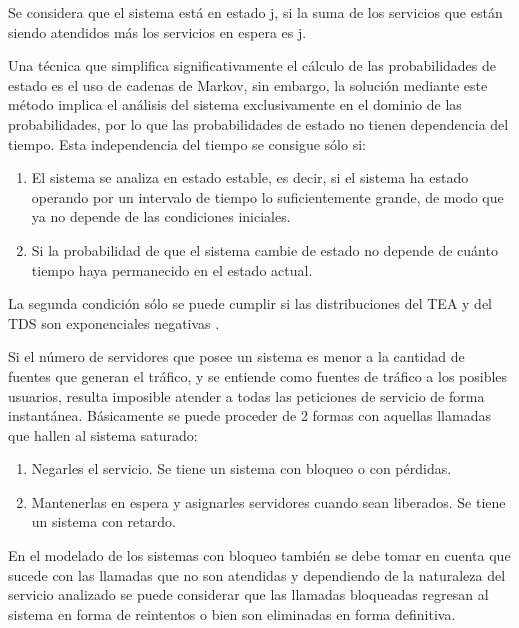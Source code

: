 Se considera que el sistema está en estado j, si la suma de los servicios que están siendo atendidos más los servicios en espera es j.\newline

Una técnica que simplifica significativamente el cálculo de las probabilidades de estado es el uso de cadenas de Markov, sin embargo, la solución mediante este método implica el análisis del sistema exclusivamente en el dominio de las probabilidades, por lo que las probabilidades de estado no tienen dependencia del tiempo. Esta independencia del tiempo se consigue sólo si:

\begin{enumerate}
\item  El sistema se analiza en estado estable, es decir, si el sistema ha estado operando por un intervalo de tiempo lo suficientemente grande, de modo que ya no depende de las condiciones iniciales.
\item  Si la probabilidad de que el sistema cambie de estado no depende de cuánto tiempo haya permanecido en el estado actual.
\end{enumerate}

 La segunda condición sólo se puede cumplir si las distribuciones del TEA y del TDS son exponenciales negativas \parencite{Carter1990}.\newline

 Si el número de servidores que posee un sistema es menor a la cantidad de fuentes que generan el tráfico, y se entiende como fuentes de tráfico a los posibles usuarios, resulta imposible atender a todas las peticiones de servicio de forma instantánea. Básicamente se puede proceder de 2 formas con aquellas llamadas que hallen al sistema saturado:
\begin{enumerate}
\item  Negarles el servicio. Se tiene un sistema con bloqueo o con pérdidas.
\item  Mantenerlas en espera y asignarles servidores cuando sean liberados. Se tiene un sistema con retardo.
\end{enumerate}

 En el modelado de los sistemas con bloqueo también se debe tomar en cuenta que sucede con las llamadas que no son atendidas y dependiendo de la naturaleza del servicio analizado se puede considerar que las llamadas bloqueadas regresan al sistema en forma de reintentos o bien son eliminadas en forma definitiva.\newline

